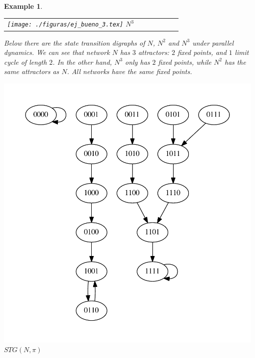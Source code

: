 \documentclass[preprint,12pt]{elsarticle}
\newcommand{\STG}{\textit{STG}}
\newtheorem{exmp}{Example}
\begin{document}
\begin{exmp}
\begin{tabular}{ccccccc}
\begin{minipage}{40 pt}
    \texttt{[image: ./figuras/ej\_bueno\_3.tex]}
\textit{$N^3$}
\end{minipage}

\end{tabular}


Below there are the state transition digraphs of $N$, $N^2$ and $N^3$ under parallel dynamics. We can see that network $N$ has $3$ attractors: $2$ fixed points, and $1$ limit cycle of length $2$. In the other hand, $N^3$ only has $2$ fixed points, while $N^2$ has the same attractors as $N$. All networks have the same fixed points.

\begin{multicols}{2}
\begin{center}
\includegraphics[scale=0.3]{./figuras/ej_bueno_1,1,1,1.pdf}
\textit{$\STG(N,\pi)$}
\end{center}
\begin{center}

\end{center}
\end{multicols}
\end{exmp}
\end{document}
